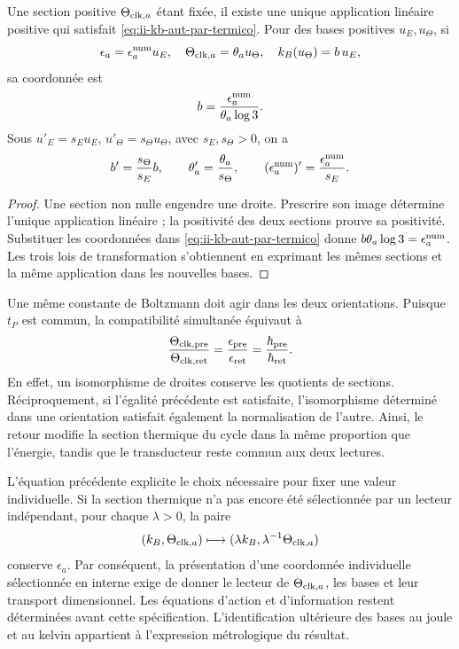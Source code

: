 \begin{samepage}
\begin{theorem}
Une section positive \(\Theta_{{\rm clk},a}\) étant fixée, il existe une unique application linéaire positive qui satisfait \eqref{eq:ii-kb-aut-par-termico}. Pour des bases positives \(u_E,u_\Theta\), si
\[
 \epsilon_a=\epsilon_a^{\rm num}u_E,\quad
 \Theta_{{\rm clk},a}=\theta_a u_\Theta,\quad
 k_B(u_\Theta)=b\,u_E,
\]
sa coordonnée est
\begin{equation}
 b=\frac{\epsilon_a^{\rm num}}{\theta_a\log3}.
 \label{eq:ii-kb-aut-coordenada}
\end{equation}
Sous \(u'_E=s_Eu_E\), \(u'_\Theta=s_\Theta u_\Theta\), avec
\(s_E,s_\Theta>0\), on a
\[
 b'=\frac{s_\Theta}{s_E}b,\qquad
 \theta'_a=\frac{\theta_a}{s_\Theta},\qquad
 (\epsilon_a^{\rm num})'=\frac{\epsilon_a^{\rm num}}{s_E}.
\]
\end{theorem}
\end{samepage}
\begin{proof}
Une section non nulle engendre une droite. Prescrire son image détermine
l'unique application linéaire ; la positivité des deux sections prouve
sa positivité. Substituer les coordonnées dans
\eqref{eq:ii-kb-aut-par-termico} donne
\(b\theta_a\log3=\epsilon_a^{\rm num}\). Les trois lois de
transformation s'obtiennent en exprimant les mêmes sections et la même
application dans les nouvelles bases.
\end{proof}

Une même constante de Boltzmann doit agir dans les deux orientations.
Puisque \(t_P\) est commun, la compatibilité simultanée équivaut à
\begin{equation}
 \frac{\Theta_{{\rm clk},{\rm pre}}}{\Theta_{{\rm clk},{\rm ret}}}
 =\frac{\epsilon_{\rm pre}}{\epsilon_{\rm ret}}
 =\frac{\hbar_{\rm pre}}{\hbar_{\rm ret}}.
 \label{eq:ii-kb-aut-orientaciones}
\end{equation}
En effet, un isomorphisme de droites conserve les quotients de sections. Réciproquement, si l'égalité précédente est satisfaite, l'isomorphisme déterminé dans une orientation satisfait également la normalisation de l'autre. Ainsi, le retour modifie la section thermique du cycle dans la même proportion que l'énergie, tandis que le transducteur reste commun aux deux lectures.

L’équation précédente explicite le choix nécessaire pour fixer une
valeur individuelle. Si la section thermique n’a pas encore été sélectionnée
par un lecteur indépendant, pour chaque \(\lambda>0\), la paire
\[
 (k_B,\Theta_{{\rm clk},a})
 \longmapsto(\lambda k_B,\lambda^{-1}\Theta_{{\rm clk},a})
\]
conserve \(\epsilon_a\). Par conséquent, la présentation d’une
coordonnée individuelle sélectionnée en interne exige de donner le lecteur de
\(\Theta_{{\rm clk},a}\), les bases et leur transport dimensionnel.
Les équations d’action et d’information restent déterminées avant
cette spécification. L’identification ultérieure des bases au
joule et au kelvin appartient à l’expression métrologique du résultat.

